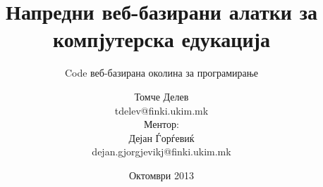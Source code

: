 

\author[T. Delev \and D. Gjorgjevikj]{
Томче Делев\\tdelev@finki.ukim.mk
\\Ментор:\\ Дејан Ѓорѓевиќ\\dejan.gjorgjevikj@finki.ukim.mk}
\title[code.finki.ukim.mk]{Напредни веб-базирани алатки за
компјутерска едукација}
\subtitle{Code веб-базирана околина за програмирање}
\date{Октомври 2013}



\frame[t,plain]{\titlepage}





